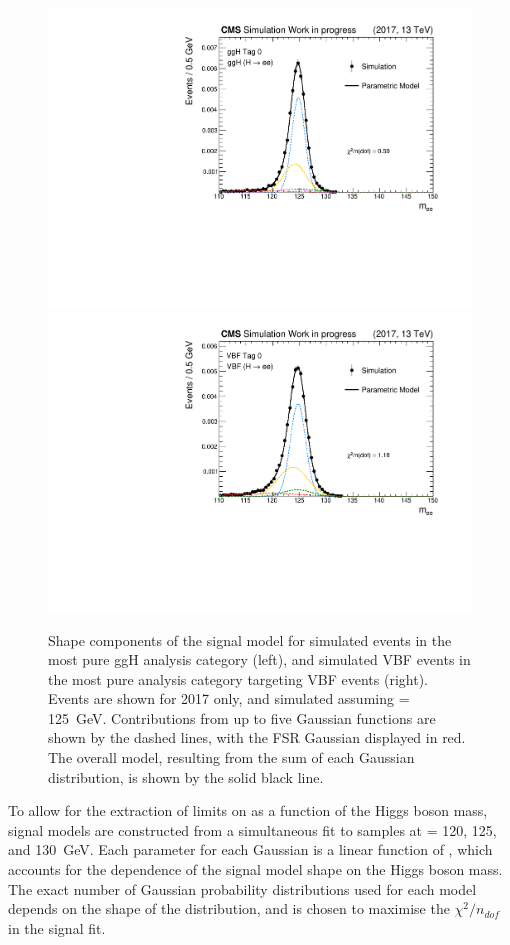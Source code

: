 \begin{figure}[htbp!]
\centering
\includegraphics[width =0.49\linewidth]{Figures/Hee/Results/sigModels/GaussSums/total_shape_pdf_components_GG2H_gghcat0.pdf}
\includegraphics[width =0.49\linewidth]{Figures/Hee/Results/sigModels/GaussSums/total_shape_pdf_components_VBF_vbfcat0.pdf}
\caption[Components of the signal model for the \ggH Tag 0 and VBF Tag 0 analysis categories.]{Shape components of the \mee signal model for simulated \ggH events in the most pure ggH analysis category (left), and simulated VBF events in the most pure analysis category targeting VBF events (right). Events are shown for 2017 only, and simulated assuming \mH= 125~GeV. Contributions from up to five Gaussian functions are shown by the dashed lines, with the FSR Gaussian displayed in red. The overall model, resulting from the sum of each Gaussian distribution, is shown by the solid black line.}
\label{fig:smode_components}
\end{figure}

To allow for the extraction of limits on \BHee as a function of the Higgs boson mass, signal models are constructed from a simultaneous fit to samples at \mH= 120, 125, and 130~GeV. Each parameter for each Gaussian is a linear function of \mH,  which accounts for the dependence of the signal model shape on the Higgs boson mass. 
The exact number of Gaussian probability distributions used for each model depends on the shape of the \mee distribution, and is chosen to maximise the $\chi^{2}/n_{dof}$ in the signal fit. %


